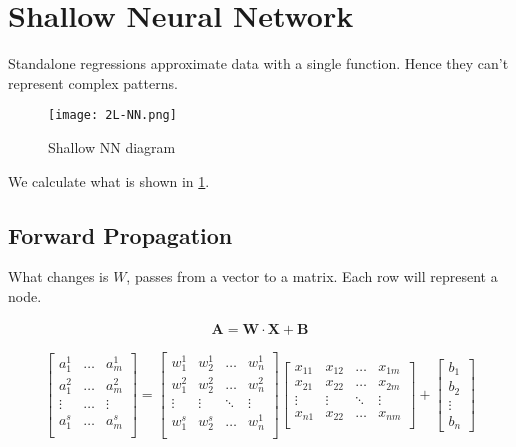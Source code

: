 \section{Shallow Neural Network}

Standalone regressions approximate data with a single function. Hence they can't represent complex patterns. 

\begin{figure}
  \texttt{[image: 2L-NN.png]}
  \caption{Shallow NN diagram}\label{fig:shallow}
\end{figure}
We calculate what is shown in \ref{fig:shallow}.

\subsection{Forward Propagation}
What changes is $W$, passes from a vector to a matrix. Each row will represent a node.

\begin{align}
  \mathbf{A} = \mathbf{W} \cdot{} \mathbf{X} + \mathbf{B} \label{eq:multi}
\end{align}

\begin{equation*}
  \begin{bmatrix}
    a_1^1 &\ldots & a_m^1\\
    a_1^2 &\ldots & a_m^2\\
    \vdots &\ldots & \vdots\\
    a_1^s &\ldots & a_m^s\\
  \end{bmatrix}
  = 
  \begin{bmatrix}
    w_1^1& w_2^1& \ldots& w_n^1\\
    w_1^2& w_2^2& \ldots& w_n^2\\
    \vdots& \vdots& \ddots& \vdots\\
    w_1^s& w_2^s& \ldots& w_n^1\\
  \end{bmatrix}
  \begin{bmatrix}
    x_{11} & x_{12} & \ldots & x_{1m}\\
    x_{21} & x_{22} & \ldots & x_{2m}\\
    \vdots & \vdots & \ddots & \vdots\\
    x_{n1} & x_{22} & \ldots & x_{nm}\\
  \end{bmatrix}
  + \begin{bmatrix}b_1\\ b_2\\ \vdots\\ b_n\end{bmatrix}
\end{equation*}

